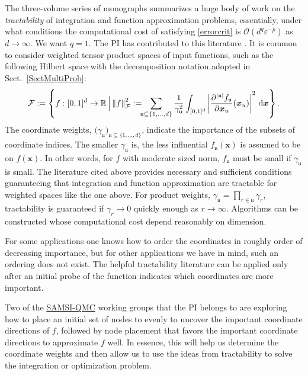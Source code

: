 \documentclass[11pt]{NSFamsart}
\newcommand{\SAMSIQMC}{\hyperlink{SAMSIlink}{SAMSI-QMC}\xspace}
\newcommand{\reals}{{\mathbb{R}}}
\newcommand{\fu}{\mathfrak{u}}
\newcommand{\bx}{{\boldsymbol{x}}}
\def\dif{\textup{d}}
\newcommand{\calf}{{\mathcal{F}}}
\def\abs#1{\ensuremath{\left \lvert #1 \right \rvert}}
\newcommand{\norm}[2][{}]{\ensuremath{\left \lVert #2 \right \rVert}_{#1}}
\newcommand{\Order}{\mathcal{O}}
\begin{document}
The three-volume series of monographs \cite{NovWoz08a,NovWoz10a,NovWoz12a} summarizes a 
huge body of work on the \emph{tractability} of integration and function approximation 
problems, essentially, under what conditions the computational cost of satisfying \eqref{errorcrit} is 
$\Order(d^q \varepsilon^{-p})$ as $d \to \infty$.  We want $q=1$.  The PI has contributed to this 
literature 
\cite{FasHicWoz12b,HicSloWas03a,HicSloWas03b,HicSloWas03c,HicSloWas03e,HicWasWoz06a,HicWoz00b,WanHic00b,YueHic04a,YueHic05a,ZhoHic15a}.
  It is 
common to consider weighted tensor product 
spaces of input functions, such as the following Hilbert space with the decomposition notation 
adopted 
in Sect.\ \ref{SectMultiProb}:
\begin{equation*}
\calf := \left\{ f : [0,1]^d \to \reals \, \Big \vert \norm[\calf]{f}^2 := \!\!\!\sum_{\fu \subseteq \{1, 
\ldots, d\}} 
\frac{1}{\gamma_{\fu}^2}\int_{[0,1]^d}\abs{\frac{\partial^{\abs{\fu}}f_{\fu}}{\partial \bx_u}(\bx_u)}^2 \,  
\dif \bx
\right\}.
\end{equation*}
The coordinate weights, $\bigl(\gamma_{\fu} \bigr)_{\fu \subseteq \{1, \ldots, d\}}$, indicate the 
importance of the subsets of coordinate indices.  The smaller $\gamma_{\fu}$ is, the less influential 
$f_\fu(\bx)$ is assumed to be on $f(\bx)$.  In other words, for $f$ with moderate sized norm, 
$f_\fu$ 
must be small if $\gamma_{\fu}$ is small. The literature cited above provides necessary and 
sufficient conditions 
guaranteeing that integration and function approximation are tractable for weighted spaces like the 
one above.  For product weights, $\gamma_{\fu} = \prod_{r \in \fu} \gamma_r$, tractability is 
guaranteed  
if $\gamma_{r} \to 0$ quickly enough as $r \to \infty$.  Algorithms can be constructed whose 
computational cost depend reasonably on dimension.

For some applications one knows how to order the coordinates in roughly order of decreasing 
importance, but for other applications we have in mind, such an ordering does not exist.  The helpful 
tractability literature can be applied only after an initial probe of the function indicates 
which coordinates are more important.

Two of the \SAMSIQMC working groups that the PI belongs to are exploring how to
place an initial set 
of nodes to evenly to uncover the important coordinate directions of $f$, followed by node 
placement that favors the important 
coordinate directions to approximate $f$ well.  In essence, this will help us determine the coordinate 
weights and then allow 
us to use the ideas from tractability to solve the integration or optimization problem.  
\end{document}
